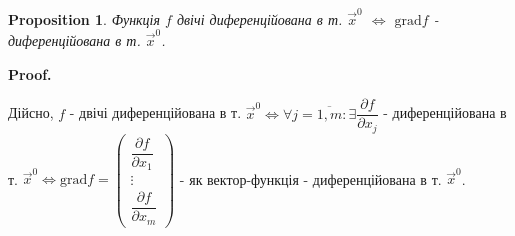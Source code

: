 \documentclass[a4paper, 10pt]{article}
\makeatletter
\def\departial#1#2{\dfrac{\partial {#1}}{\partial {#2}}}
\def\qed{$\blacksquare$}
\theoremstyle{theoremdd}
\theoremstyle{theoremdd}
\theoremstyle{theoremdd}
\theoremstyle{theoremdd}
\theoremstyle{theoremdd}
\theoremstyle{theoremdd}
\newtheorem{proposition}[theorem]{Proposition}
\theoremstyle{theoremdd}
\theoremstyle{theoremdd}
\theoremstyle{theoremdd}
\renewenvironment{proof}[1][Proof.\\]{\par
\pushQED{\hfill \qed}%
\normalfont \topsep6\p@\@plus6\p@\relax
\trivlist
\item\relax
{\bfseries
#1\@addpunct{.}}\hspace\labelsep\ignorespaces
}{%
\popQED\endtrivlist\@endpefalse
}
\newcommand\Norm[1]{\lVert#1\rVert}
\makeatother
\begin{document}
\begin{proposition}
Функція $f$ двічі диференційована в т. $\vec{x}^0$ $\iff$ $\textrm{grad} f$ - диференційована в т. $\vec{x}^0$.

\end{proposition}

\begin{proof}
Дійсно, $f$ - двічі диференційована в т. $\vec{x}^0 \iff \forall j=\overline{1,m}: \exists \departial{f}{x_j}$ - диференційована в т. $\vec{x}^0 \iff \text{grad} f = \begin{pmatrix}
\departial{f}{x_1} \\ \vdots \\ \departial{f}{x_m}
\end{pmatrix}$ - як вектор-функція - диференційована в т. $\vec{x}^0$.
\end{proof}
\end{document}
